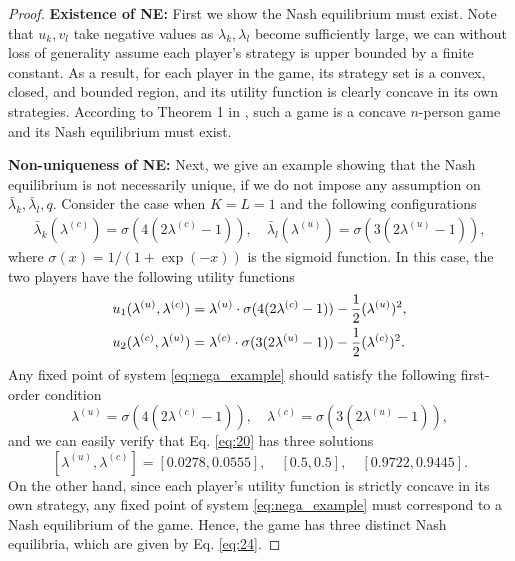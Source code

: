 \begin{proof}
\textbf{Existence of NE:} First we show the Nash equilibrium must exist. Note that $u_k, v_l$ take negative values as $\lambda_k,\lambda_l$ become sufficiently large, we can without loss of generality assume each player's strategy is upper bounded by a finite constant. As a result, for each player in the game, its strategy set is a convex, closed, and bounded region, and its utility function is clearly concave in its own strategies. According to Theorem 1 in \cite{rosen1965existence}, such a game is a concave $n$-person game and its Nash equilibrium must exist.

\textbf{Non-uniqueness of NE:}
Next, we give an example showing that the Nash equilibrium is not necessarily unique, if we do not impose any assumption on $\bar{\lambda}_k,\bar{\lambda}_l,q$. Consider the case when $K=L=1$ and the following configurations
    \begin{align*} \bar{\lambda}_k(\lambda^{(c)})=\sigma(4(2\lambda^{(c)}-1)), \quad \bar{\lambda}_l(\lambda^{(u)})=\sigma(3(2\lambda^{(u)}-1)),
    \end{align*}
    where $\sigma(x)=1/(1+\exp(-x))$ is the sigmoid function. In this case, the two players have the following utility functions
    \begin{align}\notag
        & u_1(\lambda^{(u)},\lambda^{(c)})=\lambda^{(u)}\cdot \sigma(4(2\lambda^{(c)}-1)) - \frac{1}{2} (\lambda^{(u)})^2,\\\label{eq:nega_example}
        & u_2(\lambda^{(c)},\lambda^{(u)})=\lambda^{(c)}\cdot \sigma(3(2\lambda^{(u)}-1)) - \frac{1}{2} (\lambda^{(c)})^2.
    \end{align}
    Any fixed point of system \eqref{eq:nega_example} should satisfy the following first-order condition
    \begin{equation}\label{eq:20}
    \lambda^{(u)}=\sigma(4(2\lambda^{(c)}-1)),\quad \lambda^{(c)}=\sigma(3(2\lambda^{(u)}-1)),
    \end{equation}
    and we can easily verify that Eq. \eqref{eq:20} has three solutions
    \begin{equation}\label{eq:24}
        [\lambda^{(u)}, \lambda^{(c)}]=[0.0278, 0.0555], \quad [0.5, 0.5], \quad [0.9722, 0.9445].
    \end{equation}
    On the other hand, since each player's utility function is strictly concave in its own strategy, any fixed point of system \eqref{eq:nega_example} must correspond to a Nash equilibrium of the game. Hence, the game has three distinct Nash equilibria, which are given by Eq. \eqref{eq:24}.
    

\end{proof}
